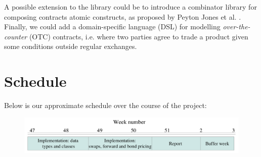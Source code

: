\documentclass[11pt]{article}
\newcommand{\comm}[2]{{\sf \(\spadesuit\){\bf #1: }{\rm \sf #2}\(\spadesuit\)}}
\newcommand{\mcomm}[2]{\marginpar{\scriptsize \comm{#1}{#2}}}
\newcommand{\ab}[1]{\mcomm{AB}{#1}}
\begin{document}

A possible extension to the library could be to introduce a combinator library for composing contracts
atomic constructs, as proposed by Peyton Jones et al. \cite{composingcontracts}.\\

Finally, we could add a domain-specific language (DSL) for modelling \emph{over-the-counter}
(OTC) contracts, i.e. where two parties agree to trade a product given some conditions
outside regular exchanges.

\section*{Schedule}


Below is our approximate schedule over the course of the project:

\begin{figure}[h!]
\begin{center}
\includegraphics[bb = 0 0 1302 348, scale=0.275]{schedule.png}
\end{center}
\end{figure}



\end{document}
